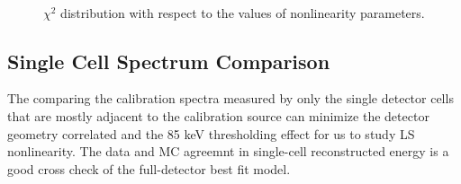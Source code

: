 \begin{figure}[h!]
\centering
{}\quad
{} \\
\caption{$\chi^2$ distribution with respect to the values of nonlinearity parameters.}
\label{fig:chi2}
\end{figure}
\newpage
\clearpage

\subsection{Single Cell Spectrum Comparison}
\label{sec:single}
The comparing the calibration spectra measured by only the single detector cells that are mostly adjacent to the calibration source can minimize the detector geometry correlated and the 85 keV thresholding effect for us to study LS nonlinearity.
The data and MC agreemnt in single-cell reconstructed energy is a good cross check of the full-detector best fit model.

